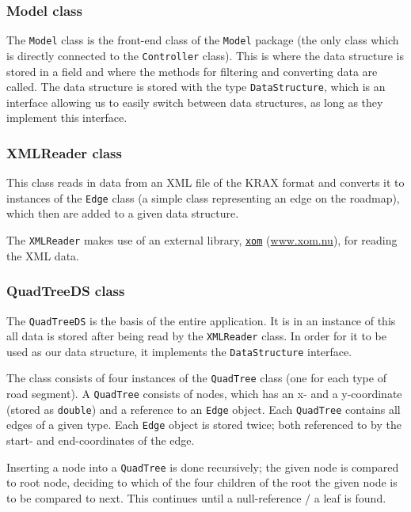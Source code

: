 \documentclass[a4paper,11pt]{article}
\begin{document}
\subsubsection{Model class} %
The \texttt{Model} class is the front-end class of the \texttt{Model} package (the only class which is directly connected to the \texttt{Controller} class). This is where the data structure is stored in a field and where the methods for filtering and converting data are called. The data structure is stored with the type \texttt{DataStructure}, which is an interface allowing us to easily switch between data structures, as long as they implement this interface.

\subsubsection{XMLReader class} %
This class reads in data from an XML file of the KRAX format and converts it to instances of the \texttt{Edge} class (a simple class representing an edge on the roadmap), which then are added to a given data structure.

The \texttt{XMLReader} makes use of an external library, \href{www.xom.nu}{\texttt{xom}} (\url{www.xom.nu}), for reading the XML data.

\subsubsection{QuadTreeDS class} %
The \texttt{QuadTreeDS} is the basis of the entire application. It is in an instance of this all data is stored after being read by the \texttt{XMLReader} class. In order for it to be used as our data structure, it implements the \texttt{DataStructure} interface.

The class consists of four instances of the \texttt{QuadTree} class (one for each type of road segment). A \texttt{QuadTree} consists of nodes, which has an x- and a y-coordinate (stored as \texttt{double}) and a reference to an \texttt{Edge} object. Each \texttt{QuadTree} contains all edges of a given type. Each \texttt{Edge} object is stored twice; both referenced to by the start- and end-coordinates of the edge.

Inserting a node into a \texttt{QuadTree} is done recursively; the given node is compared to root node, deciding to which of the four children of the root the given node is to be compared to next. This continues until a null-reference / a leaf is found.
\end{document}
